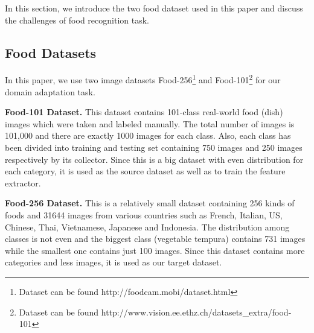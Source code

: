 In this section, we introduce the two food dataset used in this paper and discuss the challenges of food recognition task.
\subsection{Food Datasets}
 In this paper, we use two image datasets Food-256\footnote{Dataset can be found http://foodcam.mobi/dataset.html} \cite{kawano14c} and Food-101\footnote{Dataset can be found http://www.vision.ee.ethz.ch/datasets\_extra/food-101} \cite{bossard14} for our domain adaptation task.

\textbf{Food-101 Dataset.}
This dataset contains 101-class real-world food (dish) images which were taken and labeled manually. The total number of images is 101,000 and there are exactly 1000 images for each class. Also, each class has been divided into training and testing set containing 750 images and 250 images respectively by its collector. Since this is a big dataset with even distribution for each category, it is used as the source dataset as well as to train the feature extractor.

\textbf{Food-256 Dataset.}
This is a relatively small dataset containing 256 kinds of foods and 31644 images from various countries such as French, Italian, US, Chinese, Thai, Vietnamese, Japanese and Indonesia. The distribution among classes is not even and the biggest class (vegetable tempura) contains 731 images while the smallest one contains just 100 images. Since this dataset contains more categories and less images, it is used as our target dataset.

